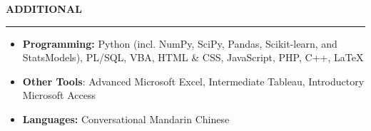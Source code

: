 \documentclass[11pt,letterpaper]{article}
\newcommand{\sectline}{\vspace{3pt}\hrule height 1.5pt\vspace{3pt}}
\newcommand{\sectspace}{\vspace{7pt}}
\begin{document}
\sectspace


\textbf{ADDITIONAL}\sectline
\begin{itemize}
	\item \textbf{Programming:} Python (incl. NumPy, SciPy, Pandas, Scikit-learn, and StatsModels), PL/SQL, VBA, HTML \& CSS, JavaScript, PHP, C++, \LaTeX
	\item \textbf{Other Tools}: Advanced Microsoft Excel, Intermediate Tableau, Introductory Microsoft Access
	\item \textbf{Languages:} Conversational Mandarin Chinese
\end{itemize}
\end{document}
